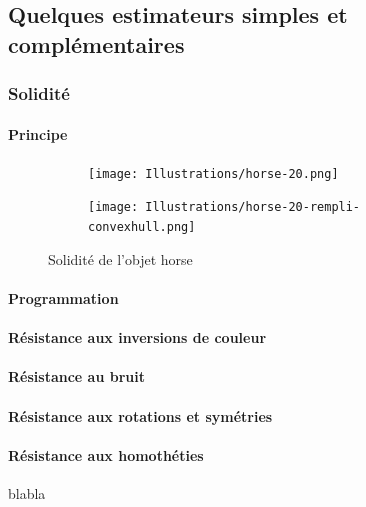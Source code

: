 \documentclass{article}
\begin{document}
    \subsection{Quelques estimateurs simples et complémentaires}

      \subsubsection{Solidité}
      
	\paragraph{Principe}
	
	  \begin{figure}[!h]
	    \centering
	    \begin{subfigure}{.25\textwidth}
	      \centering
	      \texttt{[image: Illustrations/horse-20.png]}
	      \label{horse}
	    \end{subfigure}
	    \begin{subfigure}{.25\textwidth}
	      \centering
	      \texttt{[image: Illustrations/horse-20-rempli-convexhull.png]}
	    \label{horse-rempli-convexhull}
	    \end{subfigure}
	    \caption{Solidité de l'objet horse}
	    \label{solidité}
	  \end{figure}
	
	\paragraph{Programmation}
	
	\paragraph{Résistance aux inversions de couleur}
	
	\paragraph{Résistance au bruit}
	
	\paragraph{Résistance aux rotations et symétries}
      
	\paragraph{Résistance aux homothéties} blabla \\
	
\end{document}
